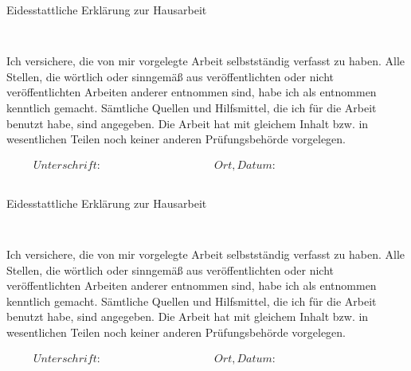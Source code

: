 
\thispagestyle{empty}

\begin{verbatim}

\end{verbatim}

\begin{LARGE}Eidesstattliche Erklärung zur Hausarbeit\end{LARGE}
\begin{verbatim}


\end{verbatim}
Ich versichere, die von mir vorgelegte Arbeit selbstständig verfasst zu 
haben. Alle Stellen, die wörtlich oder sinngemäß aus veröffentlichten 
oder nicht veröffentlichten Arbeiten anderer entnommen sind, habe ich 
als entnommen kenntlich gemacht. Sämtliche Quellen und Hilfsmittel, die 
ich für die Arbeit benutzt habe, sind angegeben. Die Arbeit hat mit 
gleichem Inhalt bzw. in wesentlichen Teilen noch keiner anderen 
Prüfungsbehörde vorgelegen.


\begin{displaymath}
\begin{array}{ll}
Unterschrift:~~~~~~~~~~~~~~~~~~~~~~~~~~~~~~~~~~~~~~~~~~
& Ort, Datum:~~~~~~~~~~~~~~~~~~~~~~~~~~~~~~~~~~~~~~~~~~
\end{array}
\end{displaymath}

\newpage


\thispagestyle{empty}

\begin{verbatim}

\end{verbatim}

\begin{LARGE}Eidesstattliche Erklärung zur Hausarbeit\end{LARGE}
\begin{verbatim}


\end{verbatim}
Ich versichere, die von mir vorgelegte Arbeit selbstständig verfasst zu 
haben. Alle Stellen, die wörtlich oder sinngemäß aus veröffentlichten 
oder nicht veröffentlichten Arbeiten anderer entnommen sind, habe ich 
als entnommen kenntlich gemacht. Sämtliche Quellen und Hilfsmittel, die 
ich für die Arbeit benutzt habe, sind angegeben. Die Arbeit hat mit 
gleichem Inhalt bzw. in wesentlichen Teilen noch keiner anderen 
Prüfungsbehörde vorgelegen.


\begin{displaymath}
\begin{array}{ll}
Unterschrift:~~~~~~~~~~~~~~~~~~~~~~~~~~~~~~~~~~~~~~~~~~
& Ort, Datum:~~~~~~~~~~~~~~~~~~~~~~~~~~~~~~~~~~~~~~~~~~
\end{array}
\end{displaymath}
